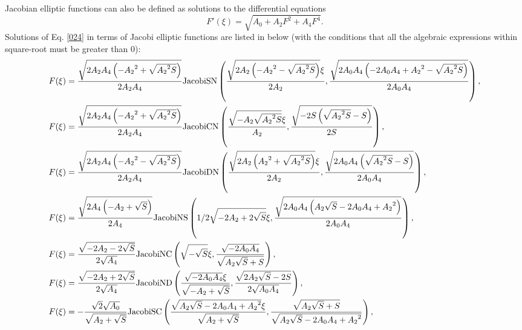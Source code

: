\documentclass[prd,aps,floats,showkeys,nofootinbib,notitlepage]{revtex4}
\begin{document}
	Jacobian elliptic functions can also be defined as solutions to the differential equations \cite{fexpn024,fexpn024_1,Schwalm}
	\begin{equation}\label{024}
		F'(\xi)=\sqrt{A_0+A_2F^2+A_4F^4}.
	\end{equation}
	Solutions of Eq. \eqref{024} in terms of  Jacobi elliptic functions are listed in below (with the conditions that all the algebraic expressions within square-root must be greater than $0$):
	\begin{subequations}\label{024_solu}
		\begin{align}
			&F(\xi)=   \frac{{\sqrt {2{A_2} {A_4} \left( { - {A_2}^2 + \sqrt {{A_2}^2S} } \right)} }}{{2{A_2} {A_4}}}{\text{JacobiSN}}\left( {\frac{{\sqrt {2{A_2} \left( { - {A_2}^2 - \sqrt {{A_2}^2S} } \right)} \xi }}{{2{A_2}}},\frac{{\sqrt {2{A_0} {A_4} \left( { - 2 {A_0} {A_4} + {A_2}^2 - \sqrt {{A_2}^2S} } \right)} }}{{2{A_0} {A_4}}}} \right), \hfill \\
			&F(\xi)=    \frac{{\sqrt {2{A_2} {A_4} \left( { - {A_2}^2 + \sqrt {{A_2}^2S} } \right)} }}{{2{A_2} {A_4}}}{\text{JacobiCN}}\left( {\frac{{\sqrt { - {A_2} \sqrt {{A_2}^2S} } \xi }}{{{A_2}}},\frac{{\sqrt { - 2S\left( {\sqrt {{A_2}^2S}  - S} \right)} }}{{2S}}} \right), \hfill \\
			&F(\xi)=    \frac{{\sqrt {2{A_2} {A_4} \left( { - {A_2}^2 - \sqrt {{A_2}^2S} } \right)} }}{{2{A_2} {A_4}}}{\text{JacobiDN}}\left( { \frac{{\sqrt {2{A_2} \left( {{A_2}^2 + \sqrt {{A_2}^2S} } \right)} \xi }}{{2{A_2}}}, \frac{{\sqrt {2{A_0} {A_4} \left( {\sqrt {{A_2}^2S}  - S} \right)} }}{{2{A_0} {A_4}}}} \right), \hfill \\
			&F(\xi)=    \frac{{\sqrt {2{A_4} \left( { - {A_2} + \sqrt S } \right)} }}{{2{A_4}}}{\text{JacobiNS}}\left( {1/2 \sqrt { - 2 {A_2} + 2 \sqrt S } \xi , \frac{{\sqrt {2{A_0} {A_4} \left( {{A_2} \sqrt S  - 2 {A_0} {A_4} + {A_2}^2} \right)} }}{{2{A_0} {A_4}}}} \right), \hfill \\
			&F(\xi)=   \frac{{\sqrt { - 2{A_2} - 2\sqrt S } }}{{2\sqrt {{A_4}} }}{\text{JacobiNC}}\left( {\sqrt { - \sqrt S } \xi ,\frac{{\sqrt { - 2 {A_0} {A_4}} }}{{\sqrt {{A_2} \sqrt S  + S} }}} \right),\\
			&F(\xi)=   \frac{{\sqrt { - 2{A_2} + 2\sqrt S } }}{{2\sqrt {{A_4}} }}{\text{JacobiND}}\left( {\frac{{\sqrt { - 2 {A_0} {A_4}} \xi }}{{\sqrt { - {A_2} + \sqrt S } }},\frac{{\sqrt {2{A_2} \sqrt S  - 2S} }}{{2\sqrt {{A_0} {A_4}} }}} \right), \hfill \\
			&F(\xi)=   - \frac{{\sqrt 2 \sqrt {{A_0}} }}{{\sqrt {{A_2} + \sqrt S } }}{\text{JacobiSC}}\left( {\frac{{\sqrt {{A_2} \sqrt S  - 2 {A_0} {A_4} + {A_2}^2} \xi }}{{\sqrt {{A_2} + \sqrt S } }},\frac{{\sqrt {{A_2} \sqrt S  + S} }}{{\sqrt {{A_2} \sqrt S  - 2 {A_0} {A_4} + {A_2}^2} }}} \right), \hfill \\

\end{align}
\end{subequations}
\end{document}
